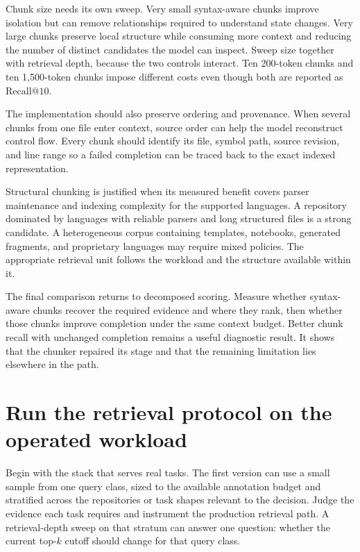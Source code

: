 Chunk size needs its own sweep. Very small syntax-aware chunks improve isolation but can remove relationships required to understand state changes. Very large chunks preserve local structure while consuming more context and reducing the number of distinct candidates the model can inspect. Sweep size together with retrieval depth, because the two controls interact. Ten 200-token chunks and ten 1,500-token chunks impose different costs even though both are reported as \(\mathrm{Recall}@10\).

The implementation should also preserve ordering and provenance. When several chunks from one file enter context, source order can help the model reconstruct control flow. Every chunk should identify its file, symbol path, source revision, and line range so a failed completion can be traced back to the exact indexed representation.

Structural chunking is justified when its measured benefit covers parser maintenance and indexing complexity for the supported languages. A repository dominated by languages with reliable parsers and long structured files is a strong candidate. A heterogeneous corpus containing templates, notebooks, generated fragments, and proprietary languages may require mixed policies. The appropriate retrieval unit follows the workload and the structure available within it.

The final comparison returns to decomposed scoring. Measure whether syntax-aware chunks recover the required evidence and where they rank, then whether those chunks improve completion under the same context budget. Better chunk recall with unchanged completion remains a useful diagnostic result. It shows that the chunker repaired its stage and that the remaining limitation lies elsewhere in the path.

\hypertarget{run-the-retrieval-protocol-on-the-operated-workload}{%
\section{Run the retrieval protocol on the operated workload}\label{run-the-retrieval-protocol-on-the-operated-workload}}

Begin with the stack that serves real tasks. The first version can use a small sample from one query class, sized to the available annotation budget and stratified across the repositories or task shapes relevant to the decision. Judge the evidence each task requires and instrument the production retrieval path. A retrieval-depth sweep on that stratum can answer one question: whether the current top-\(k\) cutoff should change for that query class.

